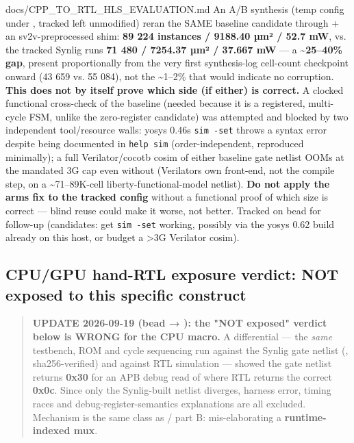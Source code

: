 \begin{relocated}{docs/CPP_TO_RTL_HLS_EVALUATION.md}
An A/B synthesis (temp config under ,
tracked  left unmodified) reran the
SAME baseline candidate through  + an
sv2v-preprocessed shim: \textbf{89 224 instances / 9188.40 µm² / 52.7
mW}, vs. the tracked Synlig run\textquotesingle s \textbf{71 480 /
7254.37 µm² / 37.667 mW} --- a \textbf{\textasciitilde25--40\% gap},
present proportionally from the very first synthesis-log cell-count
checkpoint onward (43 659 vs. 55 084), not the \textasciitilde1--2\%
that would indicate no corruption. \textbf{This does not by itself prove
which side (if either) is correct.} A clocked functional cross-check of
the baseline (needed because it is a registered, multi-cycle FSM, unlike
the zero-register  candidate) was attempted and blocked by
two independent tool/\allowbreak{}resource walls: yosys
0.46\textquotesingle s \texttt{sim\ -\allowbreak{}set} throws a syntax
error despite being documented in \texttt{help\ sim} (order-independent,
reproduced minimally); a full Verilator/\allowbreak{}cocotb cosim of
either baseline gate netlist OOMs at the mandated 3G cap even without
 (Verilator\textquotesingle s own front-end, not the
compile step, on a \textasciitilde71--89K-cell liberty-functional-model
netlist). \textbf{Do not apply the  arm\textquotesingle s fix
to the tracked  config} without a functional proof of
which size is correct --- blind reuse could make it worse, not better.
Tracked on bead  for follow-up
(candidates: get \texttt{sim\ -\allowbreak{}set} working, possibly via
the yosys 0.62 build already on this host, or budget a \textgreater3G
Verilator cosim).

\subsection{CPU/GPU hand-RTL exposure verdict: NOT exposed to this
specific construct}\label{tm:dec:cpp-to-rtl-hls-evaluation:cpugpu-hand-rtl-exposure-verdict-not-exposed-to-this-specific-construct}

\begin{quote}
\bad{} \textbf{UPDATE 2026-09-19 (bead  → ): the
"NOT exposed" verdict below is WRONG for the CPU macro.} A differential
--- the \emph{same} testbench, ROM and cycle sequencing run against the
Synlig gate netlist (,
sha256-verified) and against RTL simulation --- showed the gate netlist
returns \textbf{0x30} for an APB debug read of  where
RTL returns the correct \textbf{0x0c}. Since only the Synlig-built
netlist diverges, harness error, timing races and
debug-register-semantics explanations are all excluded. Mechanism is the
same class as / part B: 
mis-elaborating a \textbf{runtime-indexed mux}.


\end{quote}
\end{relocated}
